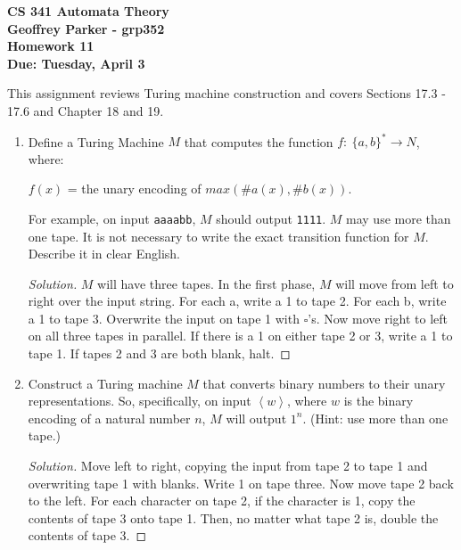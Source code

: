 \documentclass[10pt]{article}
\newcommand{\brackets}[1]{\left< #1 \right>}
\begin{document}
\begin{flushleft}
\textbf{\noindent
CS 341 Automata Theory \\
Geoffrey Parker - grp352\\
Homework 11 \\
Due: Tuesday, April 3}\\
\end{flushleft}
\noindent
This assignment reviews Turing machine construction and covers Sections 17.3 - 17.6 and Chapter 18 and 19. \\

\begin{enumerate}[1)]


\item
Define a Turing Machine $M$ that computes the function $f:\ \{a, b\}^* \rightarrow N$, where:\\
\begin{center}
$f(x)$ = the unary encoding of $max(\#a(x), \#b(x))$.  
\end{center}
For example, on input \texttt{aaaabb}, $M$ should output \texttt{1111}.  $M$ may use more than one tape.  It is not necessary to 
write the exact transition function for $M$.  Describe it in clear English.
\begin{proof}[Solution]
$M$ will have three tapes.  In the first phase, $M$ will move from left to right over the input string.  For each a, write a 1 to tape 2.  For each b, write a 1 to tape 3.  Overwrite the input on tape 1 with $\square$'s.  Now move right to left on all three tapes in parallel.  If there is a 1 on either tape 2 or 3, write a 1 to tape 1.  If tapes 2 and 3 are both blank, halt.
\end{proof}


\item
Construct a Turing machine $M$ that converts binary numbers to their unary representations.  So, specifically, on 
input $\brackets{w}$, where $w$ is the binary encoding of a natural number $n$, $M$ will output $1^n$.  (Hint: use more than one tape.)
\begin{proof}[Solution]
Move left to right, copying the input from tape 2 to tape 1 and overwriting tape 1 with blanks. Write 1 on tape three. Now move tape 2 back to the left.  For each character on tape 2, if the character is 1, copy the contents of tape 3 onto tape 1.  Then, no matter what tape 2 is, double the contents of tape 3.
\end{proof}


\end{enumerate}
\end{document}
